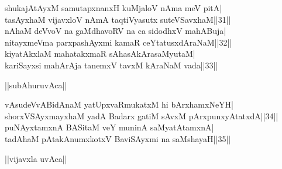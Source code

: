 \documentclass{article}
\begin{document}
shukajAtAyxM samutapxnanxH kuMjaloV nAma meV pitA|\\
tasAyxhaM vijavxloV nAmA taqtiVyasutx suteVSavxhaM||31||\\
nAhaM deVvoV na gaMdhavoRV na ca sidodhxV mahABuja|\\
nitayxmeVma parxpashAyxmi kamaR ceYtatusxdAraNaM||32||\\
kiyatAkxlaM mahatakxmaR sAhasAkArasaMyutaM|\\
kariSayxsi mahArAja tanemxV tavxM kAraNaM vada||33||\\

\begin{center}
||subAhuruvAca||
\end{center}

vAsudeVvABidAnaM yatUpxvaRmukatxM hi bArxhamxNeYH|\\
shorxVSAyxmayxhaM yadA Badarx gatiM sAvxM pArxpunxyAtatxdA||34||\\
puNAyxtamxnA BASitaM veY muninA saMyatAtamxnA|\\
tadAhaM pAtakAnumxkotxV BaviSAyxmi na saMshayaH||35||\\

\begin{center}
||vijavxla uvAca||
\end{center}
\end{document}
